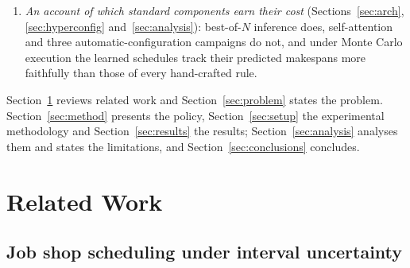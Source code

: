 \documentclass[preprint,12pt]{elsarticle}
\theoremstyle{definition}
\theoremstyle{remark}
\begin{document}
\begin{enumerate}
  contribute is settled empirically rather than assumed. Its
  examination on the trained policy: a permutation
  audit and two retraining ablations that probe the widths as inputs,
  whose effect on unseen instances is bounded within a third of a
  point either way, and the intervals as training data. And the contrast between the paradigms: a width-penalizing
  objective acts through sample selection in the policy, with the
  weights unmoved, and through the evolved representation in the GP
  study~\citep{DiazGP2026}.
\item \emph{An account of which standard components earn their cost}
  (Sections~\ref{sec:arch}, \ref{sec:hyperconfig}
  and~\ref{sec:analysis}): best-of-$N$ inference does,
  self-attention and three automatic-configuration campaigns do not,
  and under Monte Carlo execution the learned schedules track their
  predicted makespans more faithfully than those of every
  hand-crafted rule.
\end{enumerate}

Section~\ref{sec:related} reviews related work and
Section~\ref{sec:problem} states the problem.
Section~\ref{sec:method} presents the policy,
Section~\ref{sec:setup} the experimental methodology and
Section~\ref{sec:results} the results;
Section~\ref{sec:analysis} analyses them and states the limitations,
and Section~\ref{sec:conclusions} concludes.

\section{Related Work}
\label{sec:related}

\subsection{Job shop scheduling under interval uncertainty}
\end{document}
